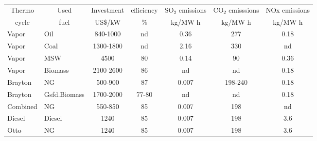 \begin{tabular}{rrccccc}
\hline
\multicolumn{1}{c}{Thermo} & \multicolumn{1}{c}{Used} & Investment & efficiency & SO$_2$ emissions & CO$_2$ emisssions & NOx emissions\\
\multicolumn{1}{c}{cycle} & \multicolumn{1}{c}{fuel} & US\$/kW & \%    & kg/MW-h & kg/MW-h & kg/MW-h \\
\hline
\multicolumn{1}{l}{Vapor} & \multicolumn{1}{l}{Oil} & 840-1000 & nd    & 0.36  & 277   & 0.18 \\
\multicolumn{1}{l}{Vapor} & \multicolumn{1}{l}{Coal} & 1300-1800 & nd    & 2.16  & 330   & nd \\
\multicolumn{1}{l}{Vapor} & \multicolumn{1}{l}{MSW} & 4500  & 80    & 0.14  & 90    & 0.36 \\
\multicolumn{1}{l}{Vapor} & \multicolumn{1}{l}{Biomass} & 2100-2600 & 86    & nd    & nd    & 0.18 \\
\multicolumn{1}{l}{Brayton} & \multicolumn{1}{l}{NG} & 500-900 & 87    & 0.007 & 198-240 & 0.18 \\
\multicolumn{1}{l}{Brayton} & \multicolumn{1}{l}{Gsfd.Biomass} & 1700-2000 & 77-80 & nd    & nd    & 0.18 \\
\multicolumn{1}{l}{Combined} & \multicolumn{1}{l}{NG} & 550-850 & 85    & 0.007 & 198   & nd \\
\multicolumn{1}{l}{Diesel} & \multicolumn{1}{l}{Diesel} & 1240  & 85    & 0.007 & 198   & 3.6 \\
\multicolumn{1}{l}{Otto} & \multicolumn{1}{l}{NG} & 1240  & 85    & 0.007 & 198   & 3.6 \\
\hline
\end{tabular}%
